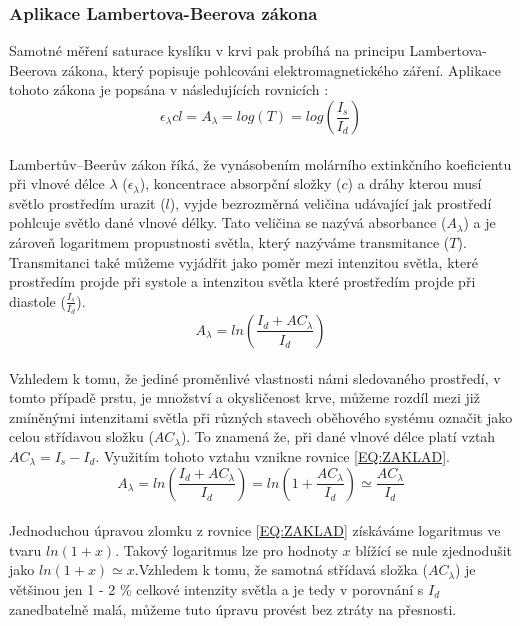 \subsubsection{Aplikace Lambertova-Beerova zákona} Samotné měření saturace kyslíku v krvi pak probíhá na principu Lambertova-Beerova zákona, který popisuje pohlcováni elektromagnetického záření. Aplikace tohoto zákona je popsána v následujících rovnicích \citep{KYRIACOU}:
\begin{equation}
  {\epsilon_{\lambda}cl} = A_{\lambda} = log(T) = log(\frac{I_s}{I_d})
  \label{EQ:Lambertův–Beerův zákon}
\end{equation}\\
Lambertův–Beerův zákon říká, že vynásobením molárního extinkčního koeficientu při vlnové délce $\lambda$ ($\epsilon_{\lambda}$), koncentrace absorpční složky ($c$) a dráhy kterou musí světlo prostředím urazit ($l$), vyjde bezrozměrná veličina udávající jak prostředí pohlcuje světlo dané vlnové délky. Tato veličina se nazývá absorbance ($A_{\lambda}$) a je zároveň logaritmem propustnosti světla, který nazýváme transmitance ($T$). Transmitanci také můžeme vyjádřit jako poměr mezi intenzitou světla, které prostředím projde při systole a intenzitou světla které prostředím projde při diastole ($\frac{I_s}{I_d}$).\\
\begin{equation}
    A_{\lambda} = ln(\frac{I_d+AC_{\lambda}}{I_d})
    \label{EQ:ZAKLAD}
\end{equation}\\
Vzhledem k tomu, že jediné proměnlivé vlastnosti námi sledovaného prostředí, v tomto případě prstu, je množství a okysličenost krve, můžeme rozdíl mezi již zmíněnými intenzitami světla při různých stavech oběhového systému označit jako celou střídavou složku ($AC_{\lambda}$). To znamená že, při dané vlnové délce platí vztah $AC_{\lambda} = I_s - I_d$. Využitím tohoto vztahu vznikne rovnice \ref{EQ:ZAKLAD}.\\
\begin{equation}
    A_{\lambda} = ln(\frac{I_d+AC_{\lambda}}{I_d}) = ln(1+\frac{AC_{\lambda}}{I_d}) \simeq \frac{AC_{\lambda}}{I_d}
\end{equation}\\
Jednoduchou úpravou zlomku z rovnice \ref{EQ:ZAKLAD} získáváme logaritmus ve tvaru $ln(1+x)$. Takový logaritmus lze pro hodnoty $x$ blížící se nule zjednodušit jako $ln(1+x)\simeq x$.Vzhledem k tomu, že samotná střídavá složka ($AC_{\lambda}$) je většinou jen 1 - 2 \% celkové intenzity světla a je tedy v porovnání s $I_d$ zanedbatelně malá, můžeme tuto úpravu provést bez ztráty na přesnosti.\\
